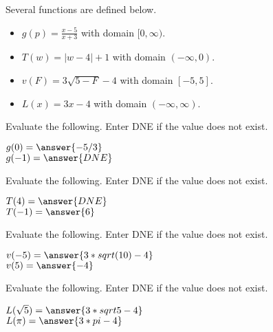 \documentclass{ximera}
\begin{document}
\begin{definition}
Several functions are defined below.
\begin{itemize}
\item $g(p) = \frac{x-5}{x+3}$ with domain $[0, \infty)$. \\ \quad
\item $T(w) = | w - 4 | + 1$ with domain $(-\infty, 0)$. 
\item $v(F) = 3\sqrt{5 - F} - 4$ with domain $[-5, 5]$. 
\item $L(x) = 3x - 4$ with domain $(-\infty, \infty)$. 
\end{itemize}
\end{definition}



\begin{exercise}
Evaluate the following.  Enter DNE if the value does not exist.

$g(0) = \answer{-5/3}$  \\
$g(-1) = \answer{DNE}$

\end{exercise}




\begin{exercise}
Evaluate the following.  Enter DNE if the value does not exist.

$T(4) = \answer{DNE}$  \\
$T(-1) = \answer{6}$

\end{exercise}




\begin{exercise}
Evaluate the following.  Enter DNE if the value does not exist.

$v(-5) = \answer{3 * sqrt(10) - 4}$  \\
$v(5) = \answer{-4}$

\end{exercise}



\begin{exercise}
Evaluate the following.  Enter DNE if the value does not exist.

$L(\sqrt{5}) = \answer{3 * sqrt{5} - 4}$  \\
$L(\pi) = \answer{3 * pi - 4}$

\end{exercise}
\end{document}
